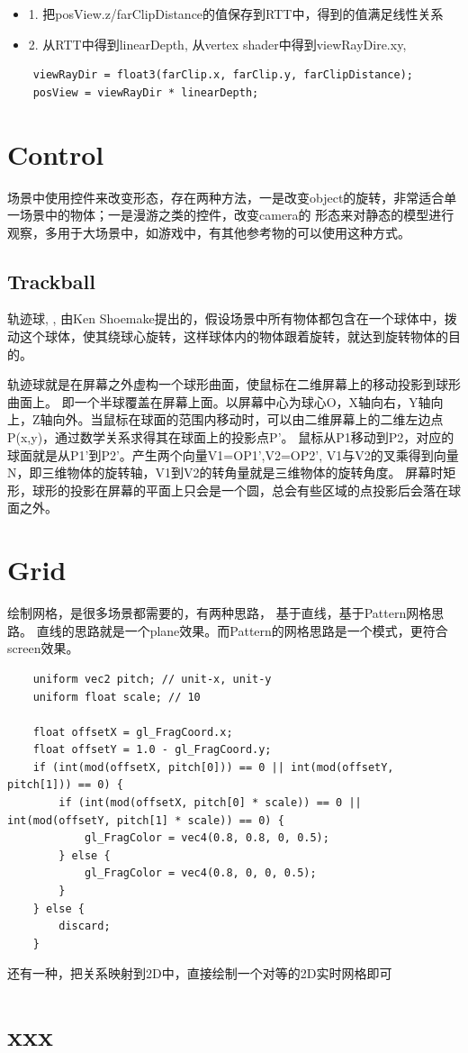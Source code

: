 \begin{itemize}
    \item {1. 把posView.z/farClipDistance的值保存到RTT中，得到的值满足线性关系}
    \item {2. 从RTT中得到linearDepth, 从vertex shader中得到viewRayDire.xy, }
\end{itemize}

\begin{lstlisting}
    viewRayDir = float3(farClip.x, farClip.y, farClipDistance);
    posView = viewRayDir * linearDepth;
\end{lstlisting}

\section{Control}

场景中使用控件来改变形态，存在两种方法，一是改变object的旋转，非常适合单一场景中的物体；一是漫游之类的控件，改变camera的
形态来对静态的模型进行观察，多用于大场景中，如游戏中，有其他参考物的可以使用这种方式。

\subsection{Trackball}

轨迹球\cite{Trackball}, \cite{VirtualTrackballsRevisited}, \cite{CmpArcBall}
由Ken Shoemake提出的，假设场景中所有物体都包含在一个球体中，拨动这个球体，使其绕球心旋转，这样球体内的物体跟着旋转，就达到旋转物体的目的。

轨迹球就是在屏幕之外虚构一个球形曲面，使鼠标在二维屏幕上的移动投影到球形曲面上。
即一个半球覆盖在屏幕上面。以屏幕中心为球心O，X轴向右，Y轴向上，Z轴向外。当鼠标在球面的范围内移动时，可以由二维屏幕上的二维左边点P(x,y)，通过数学关系求得其在球面上的投影点P'。
鼠标从P1移动到P2，对应的球面就是从P1'到P2'。产生两个向量V1=OP1',V2=OP2',  
V1与V2的叉乘得到向量N，即三维物体的旋转轴，V1到V2的转角量就是三维物体的旋转角度。
屏幕时矩形，球形的投影在屏幕的平面上只会是一个圆，总会有些区域的点投影后会落在球面之外。


\section{Grid}
绘制网格，是很多场景都需要的，有两种思路， 基于直线，基于Pattern网格思路。
直线的思路就是一个plane效果。而Pattern的网格思路是一个模式，更符合screen效果。
\begin{lstlisting}
    uniform vec2 pitch; // unit-x, unit-y
    uniform float scale; // 10

    float offsetX = gl_FragCoord.x;
    float offsetY = 1.0 - gl_FragCoord.y;
    if (int(mod(offsetX, pitch[0])) == 0 || int(mod(offsetY, pitch[1])) == 0) {
        if (int(mod(offsetX, pitch[0] * scale)) == 0 || int(mod(offsetY, pitch[1] * scale)) == 0) {
            gl_FragColor = vec4(0.8, 0.8, 0, 0.5);
        } else {
            gl_FragColor = vec4(0.8, 0, 0, 0.5);
        }
    } else {
        discard;
    }
\end{lstlisting}

还有一种，把关系映射到2D中，直接绘制一个对等的2D实时网格即可

\section{xxx}
